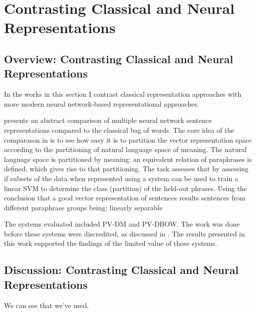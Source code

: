 \documentclass{book}
\begin{document}
\part{Contrasting Classical and Neural Representations}

\chapter{Overview: Contrasting Classical and Neural Representations}
In the works in this section I contrast classical representation approaches with more modern neural network-based representational approaches.

 presents an abstract comparison of multiple neural network sentence representations compared to the classical bag of words.
The core idea of the comparason in  is to see how easy it is to partition the vector representation space according to the partitioning of natural language space of meaning.
The natural language space is partitioned by meaning: an equivalent relation of paraphrases is defined, which gives rise to that partitioning.
The task assesses that by assessing if subsets of the data when represented using a system can be used to train a linear SVM to determine the class (partition) of the held-out phrases.
Using the conclusion that a good vector representation of sentences results sentences from different paraphrase groups being:
linearly separable



The systems evaluated included PV-DM and PV-DBOW.
The work was done before these systems were discredited, 
as discussed in .
The results presented in this work supported the findings of the limited value of those systems.




\label{SentVecMeaning}





\chapter{Discussion: Contrasting Classical and Neural Representations}
We can see that we've used.
\end{document}

